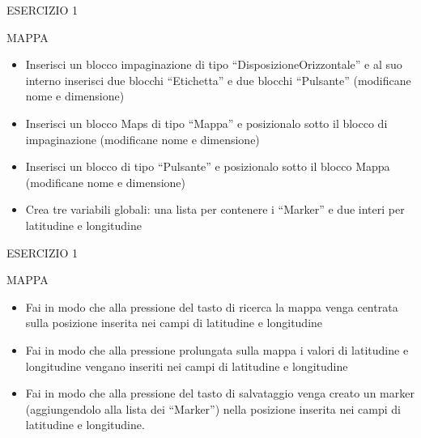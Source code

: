 \documentclass[aspectratio=1610]{beamer}
\begin{document}
\begin{frame}{ESERCIZIO 1}
    \begin{alertblock}{MAPPA}
        \begin{minipage}{0.96\linewidth}
            \begin{itemize}
                \justifying
                \item Inserisci un blocco impaginazione di tipo ``DisposizioneOrizzontale'' e al suo interno 
                inserisci due blocchi ``Etichetta'' e due blocchi ``Pulsante'' (modificane nome e dimensione)
                \pause
                \item Inserisci un blocco Maps di tipo ``Mappa'' e posizionalo sotto il blocco di impaginazione (modificane nome e dimensione)
                \pause
                \item Inserisci un blocco di tipo ``Pulsante'' e posizionalo sotto il blocco Mappa (modificane nome e dimensione)
                \pause
                \item Crea tre variabili globali: una lista per contenere i ``Marker'' e due interi per latitudine e longitudine
            \end{itemize}
        \end{minipage}
    \end{alertblock}
\end{frame}

\begin{frame}{ESERCIZIO 1}
    \begin{alertblock}{MAPPA}
        \begin{minipage}{0.96\linewidth}
            \begin{itemize}
                \justifying
                \item Fai in modo che alla pressione del tasto di ricerca la mappa venga centrata sulla posizione 
                inserita nei campi di latitudine e longitudine
                \pause
                \item Fai in modo che alla pressione prolungata sulla mappa i valori di latitudine e longitudine vengano 
                inseriti nei campi di latitudine e longitudine
                \pause
                \item Fai in modo che alla pressione del tasto di salvataggio venga creato un marker (aggiungendolo alla lista dei ``Marker'') 
                nella posizione inserita nei campi di latitudine e longitudine.
            \end{itemize}
        \end{minipage}
    \end{alertblock}
\end{frame}
\end{document}
